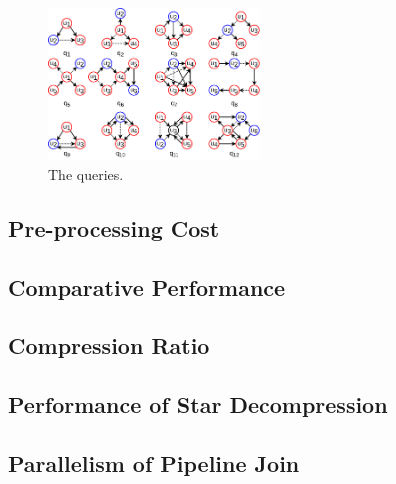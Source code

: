 \begin{figure}[ht]
  \centering
  \includegraphics[width=0.5\textwidth]{img/queries.pdf}
  \caption{The queries.}\label{img:queries}
\end{figure}

\subsection{Pre-processing Cost}
\subsection{Comparative Performance}
\subsection{Compression Ratio}
\subsection{Performance of Star Decompression}
\subsection{Parallelism of Pipeline Join}
